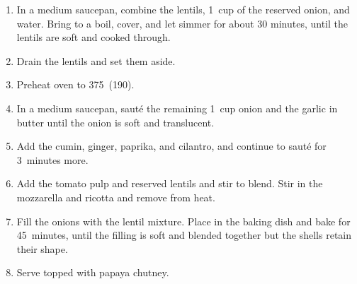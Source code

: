 
\begin{ingredients}
\end{ingredients}

\begin{recipe}
  \begin{enumerate} 

  \item In a medium saucepan, combine the lentils, 1~cup of the
  reserved onion, and water. Bring to a boil, cover, and let simmer
  for about 30 minutes, until the lentils are soft and cooked through.

  \item Drain the lentils and set them aside.

  \item Preheat oven to 375\F\ (190\C).

  \item In a medium saucepan, saut\'e the remaining 1~cup onion and
  the garlic in butter until the onion is soft and translucent.

  \item Add the cumin, ginger, paprika, and cilantro, and continue to
  saut\'e for 3~minutes more.

  \item Add the tomato pulp and reserved lentils and stir to blend.
  Stir in the mozzarella and ricotta and remove from heat.

  \item Fill the onions with the lentil mixture.  Place in the baking
  dish and bake for 45~minutes, until the filling is soft and blended
  together but the shells retain their shape.

  \item Serve topped with papaya chutney.

  \end{enumerate}
\end{recipe}


